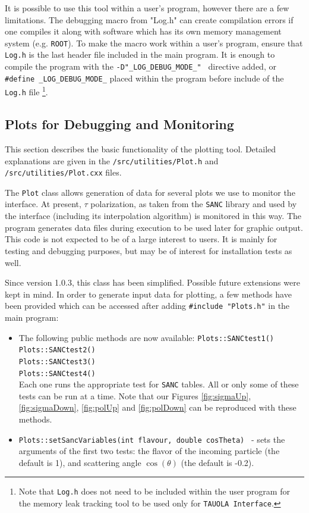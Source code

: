 \documentclass[]{Tauola_interface_design}
\begin{document}
It is possible to use this tool within a user's program, however there are a few limitations.
The debugging macro from "Log.h" can create compilation errors if one compiles
it along with software which has its own memory management system (e.g. {\tt ROOT}).
To make the macro work within a user's program, ensure that {\tt Log.h} is the last header file
included in the main program.
It is enough to  compile the program with the {\tt -D"\_LOG\_DEBUG\_MODE\_" } directive added,
or {\tt \#define \_LOG\_DEBUG\_MODE\_} placed within the program before include
of the {\tt Log.h} file%
\footnote{Note that {\tt Log.h} does not need to be included within
the user program  for the memory leak tracking tool to be used only for {\tt TAUOLA Interface}.
}.

\subsection{Plots for Debugging and Monitoring}
\label{App:PlotsDebug}
This section describes the basic functionality of the plotting tool.
Detailed explanations are given in the {\tt /src/utilities/Plot.h} and {\tt /src/utilities/Plot.cxx} files.

The {\tt Plot} class allows generation of data for several plots we use to monitor the 
interface. At present, $\tau$ polarization, as taken from the {\tt SANC} library and used by the interface (including  its
interpolation algorithm) is monitored in this way.
The program generates data files during execution to be used later for graphic output.
This code is not expected to be of a large interest to users. It is mainly for  testing and 
debugging purposes, but may be of interest for installation tests as well.

Since version 1.0.3, this class has been simplified. Possible future extensions were kept
in mind. In order to generate input data for plotting,
a few methods have been provided which can be accessed after adding 
{\tt \#include "Plots.h"} in the main program:
\begin{itemize}
  \item The following public methods are now available:
        {\tt Plots::SANCtest1() } \\
        {\tt Plots::SANCtest2() } \\
        {\tt Plots::SANCtest3() } \\
        {\tt Plots::SANCtest4() } \\
  Each one runs the appropriate test  for  {\tt SANC} 
tables. All or only some of these tests can be run at a time. Note that our 
Figures \ref{fig:sigmaUp}, \ref{fig:sigmaDown},
 \ref{fig:polUp} and \ref{fig:polDown} can be  reproduced with these methods.
  \item {\tt Plots::setSancVariables(int flavour, double cosTheta) } - sets the arguments of 
the first two tests: the flavor of the incoming particle (the default is 1), and  scattering 
angle $\cos(\theta)$ (the default is -0.2).
\end{itemize}
\end{document}
